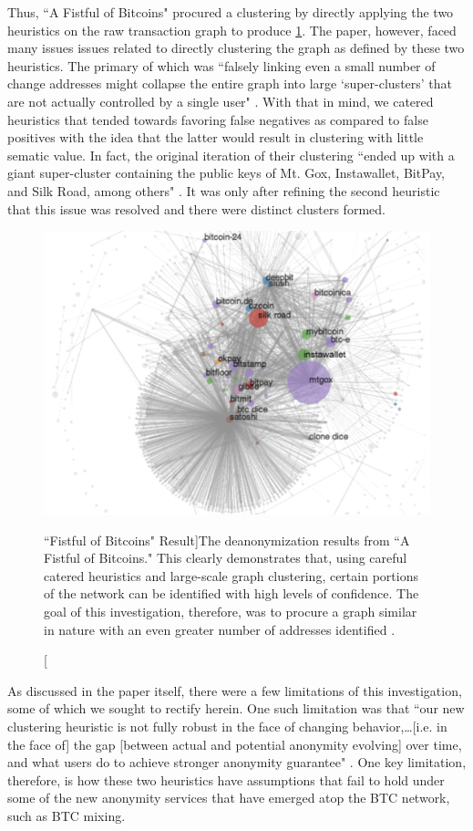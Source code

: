 \documentclass{article}
\begin{document}
Thus, ``A Fistful of Bitcoins" procured a clustering by directly applying the two heuristics on the raw transaction graph to produce \ref{fig:fistful}. The paper, however, faced many issues issues related to directly clustering the graph as defined by these two heuristics. The primary of which was ``falsely linking even a small number of change addresses might collapse the entire graph into large `super-clusters' that are not actually controlled by a single user" \cite{fistful}. With that in mind, we catered heuristics that tended towards favoring false negatives as compared to false positives with the idea that the latter would result in clustering with little sematic value. In fact, the original iteration of their clustering ``ended up with a giant super-cluster containing the public keys of Mt. Gox, Instawallet, BitPay, and Silk Road, among others" \cite{fistful}. It was only after refining the second heuristic that this issue was resolved and there were distinct clusters formed. 

\begin{figure}
    \centering
    \includegraphics[width=.75\textwidth]{fistful.png}
    \caption[``Fistful of Bitcoins" Result]{The deanonymization results from ``A Fistful of Bitcoins." This clearly demonstrates that, using careful catered heuristics and large-scale graph clustering, certain portions of the network can be identified with high levels of confidence. The goal of this investigation, therefore, was to procure a graph similar in nature with an even greater number of addresses identified \cite{fistful}.}
    \label{fig:fistful}
\end{figure}

As discussed in the paper itself, there were a few limitations of this investigation, some of which we sought to rectify herein. One such limitation was that ``our new clustering heuristic is not fully robust in the face of changing behavior,\dots[i.e. in the face of] the gap [between actual and potential anonymity evolving] over time, and what users do to achieve stronger anonymity guarantee" \cite{fistful}. One key limitation, therefore, is how these two heuristics have assumptions that fail to hold under some of the new anonymity services that have emerged atop the BTC network, such as BTC mixing.
\end{document}
